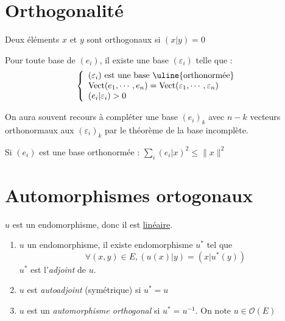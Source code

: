 \documentclass[11pt,a4paper,fleqn,pdftex]{report}
\begin{document}
\section{Orthogonalité}
\begin{dfn}
Deux éléments $x$ et $y$ sont orthogonaux si $(x|y)=0$
\end{dfn}
\begin{itheorem}
Pour toute base de $(e_i)$, il existe une base $(\varepsilon_i)$ telle que :
\begin{equation}
\left\lbrace
\begin{array}{l}
(\varepsilon_i)\text{ est une base \uline{orthonormée}}\\
\mathrm{Vect}(e_1,\cdots ,e_n) = \mathrm{Vect}(\varepsilon_1, \cdots ,\varepsilon_n)\\
(e_i|\varepsilon_i) > 0
\end{array}
\right.
\end{equation}

On aura souvent recours à compléter une base $(e_i)_k$ avec $n-k$ vecteurs orthonormaux aux $(\varepsilon_i)_k$ par le théorème de la base incomplète.
\end{itheorem}
\begin{theorem}
Si $(e_i)$ est une base orthonormée : 
$\boxed{\sum_i (e_i|x)^2 \le \| x \|^2}$
\end{theorem}

\section{Automorphismes ortogonaux}
$u$ est un endomorphisme, donc il est \uline{linéaire}.
\begin{dfn}
    \renewcommand{\theenumi}{\roman{enumi}}%
    \begin{enumerate}
        \item $u$ un endomorphisme, il existe  endomorphisme $u^*$ tel que
        \begin{equation*}
            \forall (x,y) \in E, (u(x)|y) = (x | u^*(y))
        \end{equation*}
        $u^*$ est l'\emph{adjoint} de $u$.
        \item $u$ est \emph{autoadjoint} (symétrique) si $u^* = u$ 
        \item $u$ est un \emph{automorphisme orthogonal} si $u^* = u^{-1}$. On note $u \in \mathcal{O}(E)$
    \end{enumerate}
\end{dfn}
\end{document}

